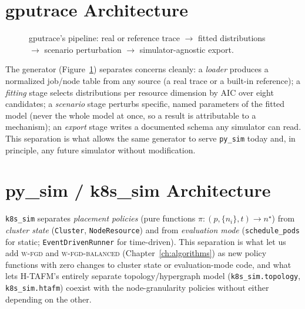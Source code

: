 \documentclass[12pt]{report}
\begin{document}
\section{gputrace Architecture}
\begin{figure}[h]
\centering
{}
\caption{gputrace's pipeline: real or reference trace $\to$ fitted
distributions $\to$ scenario perturbation $\to$ simulator-agnostic export.}
\label{fig:th-gputrace-arch}
\end{figure}

The generator (Figure~\ref{fig:th-gputrace-arch}) separates concerns
cleanly: a \emph{loader} produces a normalized job/node table from any
source (a real trace or a built-in reference); a \emph{fitting} stage
selects distributions per resource dimension by AIC over eight
candidates; a \emph{scenario} stage perturbs specific, named parameters
of the fitted model (never the whole model at once, so a result is
attributable to a mechanism); an \emph{export} stage writes a documented
schema any simulator can read. This separation is what allows the same
generator to serve \texttt{py\_sim} today and, in principle, any future
simulator without modification.

\section{py\_sim / k8s\_sim Architecture}
\texttt{k8s\_sim} separates \emph{placement policies} (pure functions
$\pi: (p, \{n_i\}, t) \to n^\star$) from \emph{cluster state}
(\texttt{Cluster}, \texttt{NodeResource}) and from \emph{evaluation mode}
(\texttt{schedule\_pods} for static; \texttt{EventDrivenRunner} for
time-driven). This separation is what let us add \textsc{w-fgd} and
\textsc{w-fgd-balanced} (Chapter~\ref{ch:algorithms}) as new policy
functions with zero changes to cluster state or evaluation-mode code, and
what lets H-TAFM's entirely separate topology/hypergraph model
(\texttt{k8s\_sim.topology}, \texttt{k8s\_sim.htafm}) coexist with the
node-granularity policies without either depending on the other.
\end{document}
